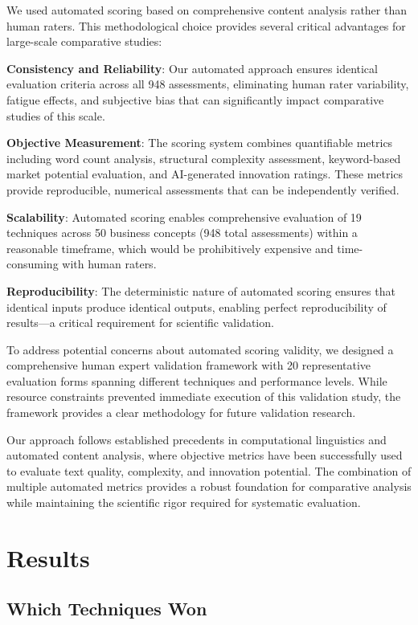 \documentclass[12pt]{article}
\begin{document}
We used automated scoring based on comprehensive content analysis rather than human raters. This methodological choice provides several critical advantages for large-scale comparative studies:

\textbf{Consistency and Reliability}: Our automated approach ensures identical evaluation criteria across all 948 assessments, eliminating human rater variability, fatigue effects, and subjective bias that can significantly impact comparative studies of this scale.

\textbf{Objective Measurement}: The scoring system combines quantifiable metrics including word count analysis, structural complexity assessment, keyword-based market potential evaluation, and AI-generated innovation ratings. These metrics provide reproducible, numerical assessments that can be independently verified.

\textbf{Scalability}: Automated scoring enables comprehensive evaluation of 19 techniques across 50 business concepts (948 total assessments) within a reasonable timeframe, which would be prohibitively expensive and time-consuming with human raters.

\textbf{Reproducibility}: The deterministic nature of automated scoring ensures that identical inputs produce identical outputs, enabling perfect reproducibility of results—a critical requirement for scientific validation.

To address potential concerns about automated scoring validity, we designed a comprehensive human expert validation framework with 20 representative evaluation forms spanning different techniques and performance levels. While resource constraints prevented immediate execution of this validation study, the framework provides a clear methodology for future validation research.

Our approach follows established precedents in computational linguistics and automated content analysis, where objective metrics have been successfully used to evaluate text quality, complexity, and innovation potential. The combination of multiple automated metrics provides a robust foundation for comparative analysis while maintaining the scientific rigor required for systematic evaluation.

\section{Results}

\subsection{Which Techniques Won}
\end{document}
